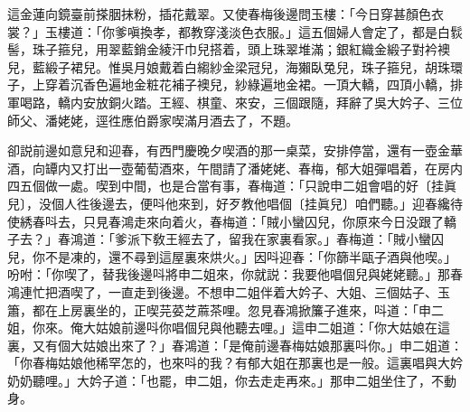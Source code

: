 這金蓮向鏡臺前搽胭抹粉，插花戴翠。又使春梅後邊問玉樓：「今日穿甚顏色衣裳？」玉樓道：「你爹嗔換孝，都教穿淺淡色衣服。」這五個婦人會定了，都是白䯼髻，珠子箍兒，用翠藍銷金綾汗巾兒搭着，頭上珠翠堆滿；銀紅織金緞子對衿襖兒，藍緞子裙兒。惟吳月娘戴着白縐紗金梁冠兒，海獺臥兔兒，珠子箍兒，胡珠環子，上穿着沉香色遍地金粧花補子襖兒，紗綠遍地金裙。一頂大轎，四頂小轎，排軍喝路，轎内安放銅火踏。王經、棋童、來安，三個跟隨，拜辭了吳大妗子、三位師父、潘姥姥，逕徃應伯爵家喫滿月酒去了，不題。

卻説前邊如意兒和迎春，有西門慶晚夕喫酒的那一桌菜，安排停當，還有一壺金華酒，向罈内又打出一壺葡萄酒來，午間請了潘姥姥、春梅，郁大姐彈唱着，在房内四五個做一處。喫到中間，也是合當有事，春梅道：「只說申二姐會唱的好〔挂眞兒〕，没個人徃後邊去，便呌他來到，好歹教他唱個〔挂眞兒〕咱們聽。」迎春纔待使綉春呌去，只見春鴻走來向着火，春梅道：「賊小蠻囚兒，你原來今日没跟了轎子去？」春鴻道：「爹派下敎王經去了，留我在家裏看家。」春梅道：「賊小蠻囚兒，你不是凍的，還不尋到這屋裏來烘火。」因呌迎春：「你篩半甌子酒與他喫。」吩咐：「你喫了，替我後邊呌將申二姐來，你就説：我要他唱個兒與姥姥聽。」那春鴻連忙把酒喫了，一直走到後邊。不想申二姐伴着大妗子、大姐、三個姑子、玉簫，都在上房裏坐的，正喫芫荽芝蔴茶哩。忽見春鴻掀簾子進來，呌道：「申二姐，你來。俺大姑娘前邊呌你唱個兒與他聽去哩。」這申二姐道：「你大姑娘在這裏，又有個大姑娘出來了？」春鴻道：「是俺前邊春梅姑娘那裏呌你。」申二姐道：「你春梅姑娘他稀罕怎的，也來呌的我？有郁大姐在那裏也是一般。這裏唱與大妗奶奶聽哩。」大妗子道：「也罷，申二姐，你去走走再來。」那申二姐坐住了，不動身。

